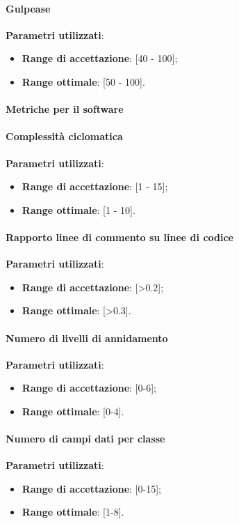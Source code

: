 \documentclass[12pt,a4paper,titlepage]{article}
\begin{document}
			\paragraph{Gulpease}
			\textbf{Parametri utilizzati}:
			\begin{itemize}
				\item \textbf{Range di accettazione}: [40 - 100];
				\item \textbf{Range ottimale}: [50 - 100].
			\end{itemize}
		
			\paragraph{Metriche per il software}
			
			\paragraph{Complessità ciclomatica}
			\textbf{Parametri utilizzati}:
			\begin{itemize}
				\item \textbf{Range di accettazione}: [1 - 15];
				\item \textbf{Range ottimale}: [1 - 10].
			\end{itemize}
		
			\paragraph{Rapporto linee di commento su linee di codice}
			\textbf{Parametri utilizzati}:
			\begin{itemize}
				\item \textbf{Range di accettazione}: [>0.2];
				\item \textbf{Range ottimale}: [>0.3].
			\end{itemize}
		
			\paragraph{Numero di livelli di annidamento}
			\textbf{Parametri utilizzati}:
			\begin{itemize}
				\item \textbf{Range di accettazione}: [0-6];
				\item \textbf{Range ottimale}: [0-4].
			\end{itemize}
		
			\paragraph{Numero di campi dati per classe}
			\textbf{Parametri utilizzati}:
			\begin{itemize}
				\item \textbf{Range di accettazione}: [0-15];
				\item \textbf{Range ottimale}: [1-8].
			\end{itemize}
		
\end{document}
